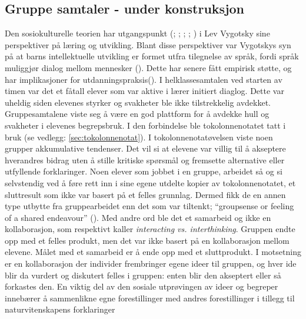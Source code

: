 \documentclass[main.tex]{subfiles}
\begin{document}
\subsection*{Gruppe samtaler - under konstruksjon}
Den sosiokulturelle teorien har utgangspunkt (; ; 
; ; ) i Lev Vygotsky sine 
perspektiver på læring og utvikling. Blant disse perspektiver var Vygotskys syn på at barns 
intellektuelle utvikling er formet utfra tilegnelse av språk, fordi språk muliggjør dialog 
mellom mennesker (). Dette har senere fått empirisk støtte, og har 
implikasjoner for utdanningspraksis().
\newline
\newline
I helklassesamtalen ved starten av timen var det et fåtall elever som var aktive i lærer initiert 
diaglog. Dette var uheldig siden elevenes styrker og svakheter ble ikke tilstrekkelig avdekket. 
Gruppesamtalene viste seg å være en god plattform for å avdekke hull og svakheter i elevenes 
begrepsbruk. I den forbindelse ble tokolonnenotatet tatt i bruk (se vedlegg: 
\ref{sec:tokolonnenotat}).
\newline
\newline
I tokolonnenotatøvelsen viste noen grupper akkumulative tendenser. Det vil si at elevene 
var villig til å akseptere hverandres bidrag uten å stille kritiske spørsmål og fremsette
alternative eller utfyllende forklaringer. Noen elever som jobbet i en gruppe, arbeidet så og si
selvstendig ved å føre rett inn i sine egene utdelte kopier av tokolonnenotatet, et sluttresult som 
ikke var basert på et felles grunnlag. Dermed fikk de en annen type utbytte fra gruppearbeidet
enn det som var tiltenkt; ``groupsense or feeling of a shared endeavour'' (). 
Med andre ord ble det et samarbeid og ikke en kollaborasjon, som  respektivt kaller 
\emph{interacting vs. interthinking}. Gruppen endte opp med et felles produkt, men det var ikke 
basert på en kollaborasjon mellom elevene. Målet med et samarbeid er å ende opp med et sluttprodukt. 
I motsetning er en kollaborasjon der individer frembringer egene ideer til gruppen, og hver ide
blir da vurdert og diskutert felles i gruppen: enten blir den akseptert eller så forkastes den.
\newline
\newline
En viktig del av den sosiale utprøvingen av ideer og begreper innebærer å sammenlikne egne 
forestillinger med andres forestillinger i tillegg til naturvitenskapens forklaringer 
\end{document}
